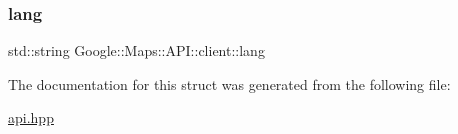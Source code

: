 \subsubsection{\texorpdfstring{lang}{lang}}
{\footnotesize\ttfamily std\+::string Google\+::\+Maps\+::\+A\+P\+I\+::client\+::lang\hspace{0.3cm}{\ttfamily [private]}}



The documentation for this struct was generated from the following file\+:\begin{DoxyCompactItemize}
\item 
\hyperlink{a00005}{api.\+hpp}\end{DoxyCompactItemize}
